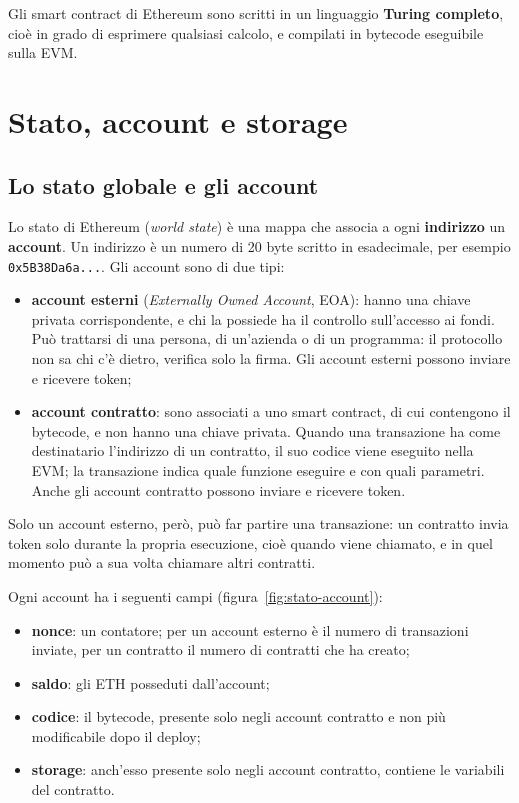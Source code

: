 \documentclass[a4paper, 11pt, oneside]{book}
\newcommand{\cod}[1]{\texttt{#1}} %
\begin{document}
	Gli smart contract di Ethereum sono scritti in un linguaggio \textbf{Turing
	completo}, cioè in grado di esprimere qualsiasi calcolo, e compilati in bytecode
	eseguibile sulla EVM.

	\section{Stato, account e storage}
	\subsection{Lo stato globale e gli account}
	Lo stato di Ethereum (\textit{world state}) è una mappa che associa a ogni
	\textbf{indirizzo} un \textbf{account}. Un indirizzo è un numero di 20 byte scritto
	in esadecimale, per esempio \cod{0x5B38Da6a...}. Gli account sono di due tipi:
	\begin{itemize}
		\item \textbf{account esterni} (\textit{Externally Owned Account}, EOA): hanno una
			chiave privata corrispondente, e chi la possiede ha il controllo sull'accesso
			ai fondi. Può trattarsi di una persona, di un'azienda o di un programma: il
			protocollo non sa chi c'è dietro, verifica solo la firma. Gli account esterni
			possono inviare e ricevere token;
		\item \textbf{account contratto}: sono associati a uno smart contract, di cui
			contengono il bytecode, e non hanno una chiave privata. Quando una transazione
			ha come destinatario l'indirizzo di un contratto, il suo codice viene eseguito
			nella EVM; la transazione indica quale funzione eseguire e con quali
			parametri. Anche gli account contratto possono inviare e ricevere token.
	\end{itemize}
	Solo un account esterno, però, può far partire una transazione: un contratto invia
	token solo durante la propria esecuzione, cioè quando viene chiamato, e in quel
	momento può a sua volta chiamare altri contratti.

	Ogni account ha i seguenti campi (figura~\ref{fig:stato-account}):
	\begin{itemize}
		\item \textbf{nonce}: un contatore; per un account esterno è il numero di
			transazioni inviate, per un contratto il numero di contratti che ha creato;
		\item \textbf{saldo}: gli ETH posseduti dall'account;
		\item \textbf{codice}: il bytecode, presente solo negli account contratto e non più
			modificabile dopo il deploy;
		\item \textbf{storage}: anch'esso presente solo negli account contratto, contiene
			le variabili del contratto.
	\end{itemize}
\end{document}
